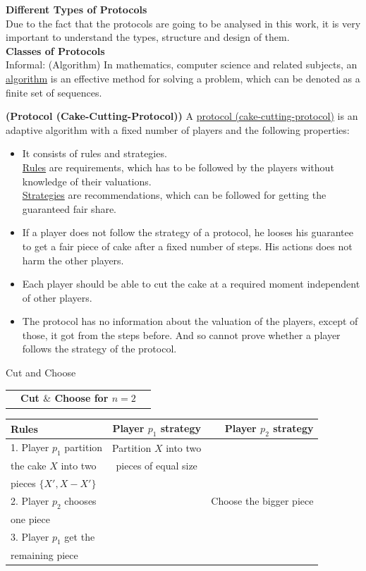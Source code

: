 \newpage
\textbf{Different Types of Protocols}\\
\newline
Due to the fact that the protocols are going to be analysed in this work, it is very important to understand the types, structure and design of them.\\
\newline
\textbf{Classes of Protocols}\\
\newline
Informal: (Algorithm)
\newline In mathematics, computer science and related subjects, an
\underline{algorithm} is an effective method for solving a problem, which can be denoted as a finite set of sequences.
\begin{defi}{\textbf{(Protocol (Cake-Cutting-Protocol))}}
\newline A \underline{protocol (cake-cutting-protocol)} is an adaptive algorithm with a fixed number of players and the following properties:
\begin{itemize}
\item{It consists of rules and strategies.\\ \underline{Rules} are requirements, which has to be followed by the players without knowledge of their valuations.\\
\underline{Strategies} are recommendations, which can be followed for getting the guaranteed fair share.}
\item{If a player does not follow the strategy of a protocol, he looses his guarantee to get a fair piece of cake after a fixed number of steps. His actions does not harm the other players.}
\item Each player should be able to cut the cake at a required moment independent of other players.
\item The protocol has no information about the valuation of the players, except of those, it got from the steps before. And so cannot prove whether a player follows the strategy of the protocol.
\end{itemize}
\end{defi}
\begin{bsp}
Cut and Choose\\
\begin{tabular*}{\textwidth}[]{|ccc|}
\hline
\hline
&\textbf{Cut $\&$ Choose for $n=2$}&\\
\end{tabular*}
\begin{tabular*}{\textwidth}[]{|l|c|r|}
\hline
\textbf{Rules}& \textbf{Player $p_1$ strategy}& \textbf{Player $p_2$ strategy}\\
\hline
1. Player $p_1$ partition &Partition $X$ into two&\\
the cake $X$ into two&pieces of equal size&\\
pieces $\{X',X-X'\}$&&\\
\hline
2. Player $p_2$ chooses&&Choose the bigger piece\\
one piece&&\\
\hline
3. Player $p_1$ get the &&\\remaining piece&&\\
\hline
\end{tabular*}
\end{bsp}
